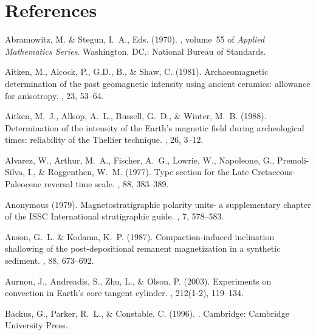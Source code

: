 \chapter{References}



Abramowitz, M. \& Stegun, I.~A., Eds. (1970).
, volume~55 of {\em Applied
  Mathematics Series}.
\newblock Washington, DC.: National Bureau of Standards.

Aitken, M., Alcock, P., G.D., B., \& Shaw, C. (1981).
\newblock Archaeomagnetic determination of the past geomagnetic intensity using
  ancient ceramics: allowance for anisotropy.
, 23, 53--64.

Aitken, M.~J., Allsop, A.~L., Bussell, G.~D., \& Winter, M.~B. (1988).
\newblock Determination of the intensity of the Earth's magnetic field during
  archeological times: reliability of the Thellier technique.
, 26, 3--12.

Alvarez, W., Arthur, M.~A., Fischer, A.~G., Lowrie, W., Napoleone, G.,
  Premoli-Silva, I., \& Roggenthen, W.~M. (1977).
\newblock Type section for the Late Cretaceous-Paleocene reversal time scale.
, 88, 383--389.

Anonymous (1979).
\newblock Magnetostratigraphic polarity units- a supplementary chapter of the
  {ISSC} International stratigraphic guide.
, 7, 578--583.

Anson, G.~L. \& Kodama, K.~P. (1987).
\newblock Compaction-induced inclination shallowing of the post-depositional
  remanent magnetization in a synthetic sediment.
, 88, 673--692.

Aurnou, J., Andreadis, S., Zhu, L., \& Olson, P. (2003).
\newblock Experiments on convection in Earth's core tangent cylinder.
, 212(1-2), 119--134.

Backus, G., Parker, R.~L., \& Constable, C. (1996).
.
\newblock Cambridge: Cambridge University Press.

